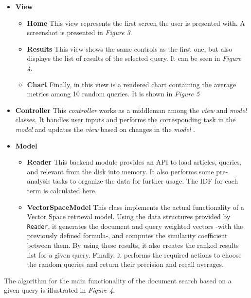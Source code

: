 \documentclass{article}
\def\code#1{\texttt{#1}}
\begin{document}
\begin{itemize}
	\item \textbf{View} {
		\begin{itemize}
			\item \textbf{Home} {
				This view represents the first screen the user is presented with. A screenshot is presented in \textit{Figure 3}.
			}
			\item \textbf{Results} {
				This view shows the same controls as the first one, but also displays the list of results of the selected query. It can be seen in \textit{Figure 4}.
			}
			\item \textbf{Chart} {
				Finally, in this view is a rendered chart containing the average metrics among 10 random queries. It is shown in \textit{Figure 5}
			}
		\end{itemize}
	}

	\item \textbf{Controller} {
		This \textit{controller} works as a middleman among the \textit{view} and \textit{model} classes. It handles user inputs and performs the corresponding task in the \textit{model} and updates the \textit{view} based on changes in the \textit{model} .
	}


	\item \textbf{Model} {
		\begin{itemize}
			\item \textbf{Reader} {
				This backend module provides an API to load articles, queries, and relevant from the disk into memory. It also performs some pre-analysis tasks to organize the data for further usage. The IDF for each term is calculated here.
			}
			\item \textbf{VectorSpaceModel} {
				This class implements the actual functionality of a Vector Space retrieval model. Using the data structures provided by \code{Reader}, it generates the document and query weighted vectors -with the previously defined formula-, and computes the similarity coefficient between them. By using these results, it also creates the ranked results list for a given query. Finally, it performs the required actions to choose the random queries and return their precision and recall averages.
			}
		\end{itemize}
	}
\end{itemize}

The algorithm for the main functionality of the document search based on a given query is illustrated in \textit{Figure 4}.
\end{document}
